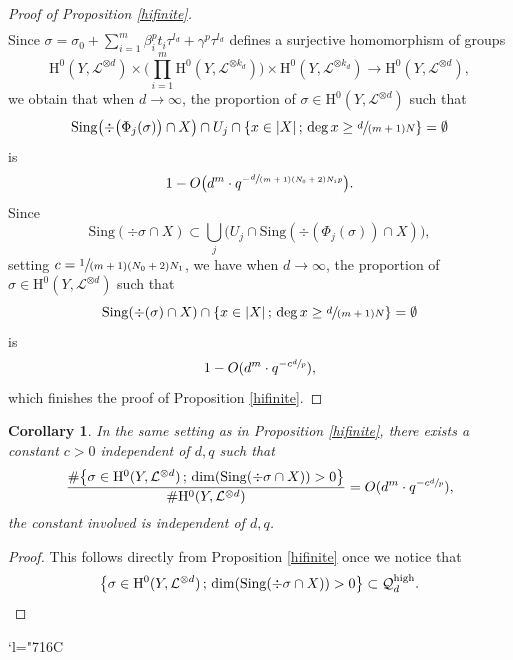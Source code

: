 \documentclass[JEP,XML,SOM,Unicode,published]{cedram}
\newcommand{\Changelback}{\mathcode`l="716C}
\newcommand{\sep}{\,;\,}
\theoremstyle{plain}
\newtheorem{cor}[thm]{Corollary}
\theoremstyle{definition}
\newcommand{\ho}{\mathrm{H}}
\begin{document}
\begin{proof}[Proof of Proposition \ref{hifinite}]
\begin{align*}
\end{align*}
Since $\sigma=\sigma_0+\sum_{i=1}^{m} \beta_i^pt_i\tau^{l_d}+\gamma^p\tau^{l_d}$ defines a surjective homomorphism of groups
\[
\ho^0(Y,\mathcal{L}^{\otimes d})\times \biggl(\prod_{i=1}^m \ho^0(Y,\mathcal{L}^{\otimes k_d}) \biggr) \times \ho^0(Y, \mathcal{L}^{\otimes k_d}) \to \ho^0(Y, \mathcal{L}^{\otimes d}),
\]
we obtain that when $d\to \infty$, the proportion of $\sigma\in \ho^0(Y, \mathcal{L}^{\otimes d})$ such that
\[
\mathrm{Sing}\bigl(\div \big(\Phi_j(\sigma)\big)\cap X\bigr) \cap U_j\cap \left\{ x\in |X|\sep \deg x\geq\sfrac{d}{(m+1)N} \right\}=\emptyset
\]
is
\[
1-O\bigl(d^{m}\cdot q^{-\sfrac{d}{(m+1)(N_0+2)N_1 p}}\bigr).
\]
Since
\[
\mathrm{Sing}(\div \sigma\cap X)\subset \bigcup_{j} \bigl(U_j\cap \mathrm{Sing}(\div (\Phi_j(\sigma))\cap X)\bigr),
\]
setting $c=\sfrac{1}{(m+1)(N_0+2)N_1}$, we have when $d\to \infty$, the proportion of $\sigma\in \ho^0(Y, \mathcal{L}^{\otimes d})$ such that
\[
\mathrm{Sing}(\div (\sigma)\cap X) \cap \left\{ x\in |X|\sep \deg x\geq\sfrac{d}{(m+1)N} \right\}=\emptyset
\]
is
\[
1-O(d^{m}\cdot q^{-c\sfrac{d}{p}}),
\]
which finishes the proof of Proposition \ref{hifinite}.
\end{proof}

\begin{cor}\label{hidim}
In the same setting as in Proposition \ref{hifinite}, there exists a constant $c>0$ independent of $d,q$ such that
\[
\frac{ \#\bigl\{ \sigma \in \ho^0(Y, \mathcal{L}^{\otimes d})\sep \dim(\mathrm{Sing}(\div \sigma\cap X))>0 \bigr\}}{\# \ho^0(Y, \mathcal{L}^{\otimes d})}=O(d^{m}\cdot q^{-c\sfrac{d}{p}}),
\]
the constant involved is independent of $d,q$.
\end{cor}
\begin{proof}
This follows directly from Proposition \ref{hifinite} once we notice that
\[
\left\{ \sigma \in \ho^0(Y, \mathcal{L}^{\otimes d})\sep \dim(\mathrm{Sing}(\div \sigma\cap X))>0 \right\}\subset \mathcal{Q}_{d}^{\mathrm{high}}.\qedhere
\]
\end{proof}
\Changelback

\end{document}

